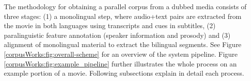 

The methodology for obtaining a parallel corpus from a dubbed media consists of three stages: (1) a monolingual step, where audio+text pairs are extracted from the movie in both languages using transcripts and cues in subtitles, (2) paralinguistic feature annotation (speaker information and prosody) and (3) alignment of monolingual material to extract the bilingual segments. See Figure \ref{corpusWorks:fig:overall-scheme} for an overview of the system pipeline. Figure \ref{corpusWorks:fig:example_pipeline} further illustrates the whole process on an example portion of a movie. Following subsections explain in detail each process. 

